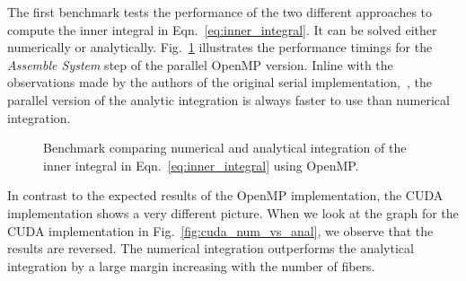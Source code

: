 The first benchmark tests the performance of the two different approaches to compute the inner integral in Eqn.~\eqref{eq:inner_integral}. It can be solved either numerically or analytically. Fig.~\ref{fig:openmp_num_vs_anal} illustrates the performance timings for the \emph{Assemble System} step of the parallel OpenMP version. Inline with the observations made by the authors of the original serial implementation,~\cite{Tornberg2006}, the parallel version of the analytic integration is always faster to use than numerical integration.
\begin{figure}[!htbp]
  \centering
  \caption[Benchmark computing inner integral on CPU.]{Benchmark comparing numerical and analytical integration of the inner integral in Eqn.~\eqref{eq:inner_integral} using OpenMP.}
  \label{fig:openmp_num_vs_anal}
\end{figure}

In contrast to the expected results of the OpenMP implementation, the CUDA implementation shows a very different picture. When we look at the graph for the CUDA implementation in Fig.~\ref{fig:cuda_num_vs_anal}, we observe that the results are reversed. The numerical integration outperforms the analytical integration by a large margin increasing with the number of fibers.

